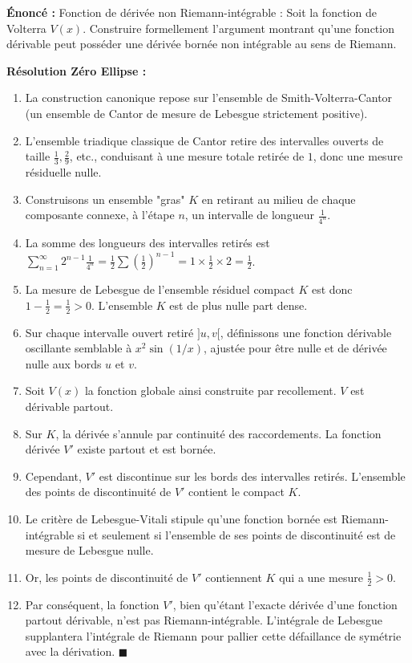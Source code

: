 \documentclass[11pt,a4paper]{article}
\begin{document}
\textbf{Énoncé :}
Fonction de dérivée non Riemann-intégrable : Soit la fonction de Volterra $V(x)$. Construire formellement l'argument montrant qu'une fonction dérivable peut posséder une dérivée bornée non intégrable au sens de Riemann.

\textbf{Résolution Zéro Ellipse :}
\begin{enumerate}
\item La construction canonique repose sur l'ensemble de Smith-Volterra-Cantor (un ensemble de Cantor de mesure de Lebesgue strictement positive).
\item L'ensemble triadique classique de Cantor retire des intervalles ouverts de taille $\frac{1}{3}, \frac{2}{9}$, etc., conduisant à une mesure totale retirée de $1$, donc une mesure résiduelle nulle.
\item Construisons un ensemble "gras" $K$ en retirant au milieu de chaque composante connexe, à l'étape $n$, un intervalle de longueur $\frac{1}{4^n}$.
\item La somme des longueurs des intervalles retirés est $\sum_{n=1}^\infty 2^{n-1} \frac{1}{4^n} = \frac{1}{2} \sum (\frac{1}{2})^{n-1} = 1 \times \frac{1}{2} \times 2 = \frac{1}{2}$.
\item La mesure de Lebesgue de l'ensemble résiduel compact $K$ est donc $1 - \frac{1}{2} = \frac{1}{2} > 0$. L'ensemble $K$ est de plus nulle part dense.
\item Sur chaque intervalle ouvert retiré $]u, v[$, définissons une fonction dérivable oscillante semblable à $x^2 \sin(1/x)$, ajustée pour être nulle et de dérivée nulle aux bords $u$ et $v$.
\item Soit $V(x)$ la fonction globale ainsi construite par recollement. $V$ est dérivable partout.
\item Sur $K$, la dérivée s'annule par continuité des raccordements. La fonction dérivée $V'$ existe partout et est bornée.
\item Cependant, $V'$ est discontinue sur les bords des intervalles retirés. L'ensemble des points de discontinuité de $V'$ contient le compact $K$.
\item Le critère de Lebesgue-Vitali stipule qu'une fonction bornée est Riemann-intégrable si et seulement si l'ensemble de ses points de discontinuité est de mesure de Lebesgue nulle.
\item Or, les points de discontinuité de $V'$ contiennent $K$ qui a une mesure $\frac{1}{2} > 0$.
\item Par conséquent, la fonction $V'$, bien qu'étant l'exacte dérivée d'une fonction partout dérivable, n'est pas Riemann-intégrable. L'intégrale de Lebesgue supplantera l'intégrale de Riemann pour pallier cette défaillance de symétrie avec la dérivation. $\blacksquare$
\end{enumerate}
\end{document}
